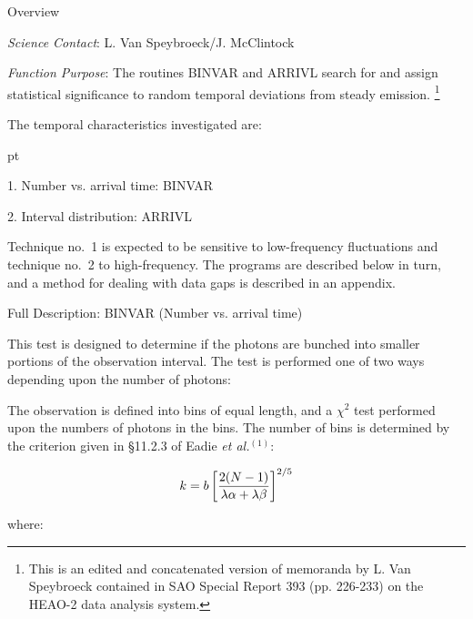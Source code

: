 %
\def\version{\it Rev. 1.0 --- 4/1/86}
\def\chapter{\it Timing Analysis: Random Deviations}

\@{Overview}

\noindent
{\it Science Contact}:  L. Van Speybroeck/J. McClintock

\noindent
{\it Function Purpose}:
The routines BINVAR and ARRIVL search for and assign statistical significance 
to random temporal deviations from steady emission.
\footnote*{This is an edited and concatenated
version of memoranda by L. Van Speybroeck contained in SAO Special
Report 393 (pp. 226-233) on the HEAO-2 data analysis system.}


The temporal characteristics investigated are:

 pt

\item{1.} Number vs. arrival time:  BINVAR
\item{2.} Interval distribution:  ARRIVL

Technique no.~1 is expected to be sensitive to low-frequency fluctuations
and technique no.~2 to high-frequency.  The programs are described below
in turn, and a method for dealing with data gaps is described in an appendix.


\@{Full Description:  BINVAR (Number vs. arrival time)}

This test is designed to determine if the photons are bunched into smaller
portions of the observation interval.  The test is performed one of two
ways depending upon the number of photons:



{\list

The observation is defined into bins of equal length, and a $\chi^2$ test 
performed upon the numbers of photons in the bins.  The number of bins is 
determined by the criterion given in \S 11.2.3 of Eadie {\it et al.}$^{(1)}$:

}

$$k = b \left[ {2(N-1)\over \lambda\alpha + \lambda\beta} \right]^{2/5}$$

\itemitem{}where:


